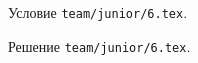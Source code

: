\problem{}
Условие \texttt{team/junior/6.tex}.

\solution Решение \texttt{team/junior/6.tex}.
\endproblem
